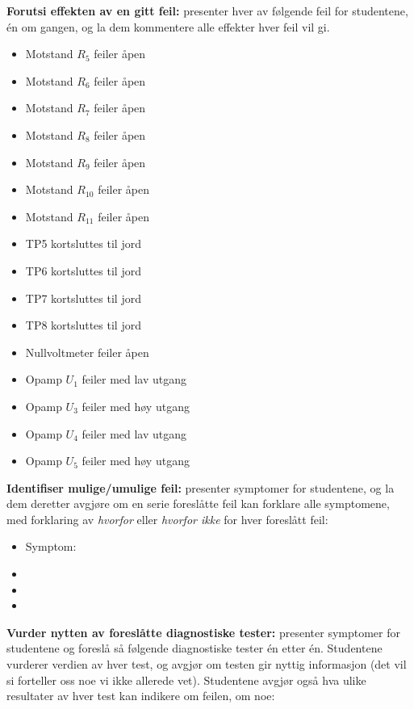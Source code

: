 \noindent
{\bf Forutsi effekten av en gitt feil:} presenter hver av følgende feil for studentene, én om gangen, og la dem kommentere alle effekter hver feil vil gi.

\begin{itemize}
\item{} Motstand $R_5$ feiler åpen
\item{} Motstand $R_6$ feiler åpen
\item{} Motstand $R_7$ feiler åpen
\item{} Motstand $R_8$ feiler åpen
\item{} Motstand $R_9$ feiler åpen
\item{} Motstand $R_{10}$ feiler åpen
\item{} Motstand $R_{11}$ feiler åpen
\item{} TP5 kortsluttes til jord 
\item{} TP6 kortsluttes til jord 
\item{} TP7 kortsluttes til jord 
\item{} TP8 kortsluttes til jord 
\item{} Nullvoltmeter feiler åpen
\item{} Opamp $U_1$ feiler med lav utgang
\item{} Opamp $U_3$ feiler med høy utgang
\item{} Opamp $U_4$ feiler med lav utgang
\item{} Opamp $U_5$ feiler med høy utgang
\end{itemize}


\vskip 10pt


\noindent
{\bf Identifiser mulige/umulige feil:} presenter symptomer for studentene, og la dem deretter avgjøre om en serie foreslåtte feil kan forklare alle symptomene, med forklaring av {\it hvorfor} eller {\it hvorfor ikke} for hver foreslått feil:

\begin{itemize}
\item{} Symptom: {\it }
\item{} 
\item{} 
\item{} 
\end{itemize}


\vskip 10pt


\noindent
{\bf Vurder nytten av foreslåtte diagnostiske tester:} presenter symptomer for studentene og foreslå så følgende diagnostiske tester én etter én. Studentene vurderer verdien av hver test, og avgjør om testen gir nyttig informasjon (det vil si forteller oss noe vi ikke allerede vet). Studentene avgjør også hva ulike resultater av hver test kan indikere om feilen, om noe:

